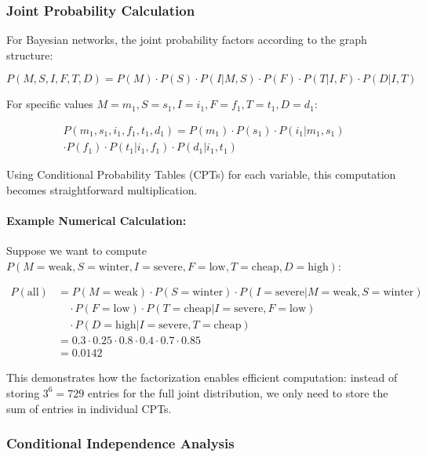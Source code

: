 \documentclass[conference]{IEEEtran}
\begin{document}
\subsubsection{Joint Probability Calculation}

For Bayesian networks, the joint probability factors according to the graph structure:

\begin{equation}
P(M, S, I, F, T, D) = P(M) \cdot P(S) \cdot P(I | M, S) \cdot P(F) \cdot P(T | I, F) \cdot P(D | I, T)
\end{equation}

For specific values $M = m_1, S = s_1, I = i_1, F = f_1, T = t_1, D = d_1$:

\begin{multline}
P(m_1, s_1, i_1, f_1, t_1, d_1) = P(m_1) \cdot P(s_1) \cdot P(i_1 | m_1, s_1) \\ 
\cdot P(f_1) \cdot P(t_1 | i_1, f_1) \cdot P(d_1 | i_1, t_1)
\end{multline}

Using Conditional Probability Tables (CPTs) for each variable, this computation becomes straightforward multiplication.

\paragraph{Example Numerical Calculation:}
Suppose we want to compute $P(M=\text{weak}, S=\text{winter}, I=\text{severe}, F=\text{low}, T=\text{cheap}, D=\text{high})$:

\begin{align*}
P(\text{all}) &= P(M=\text{weak}) \cdot P(S=\text{winter}) \cdot P(I=\text{severe} | M=\text{weak}, S=\text{winter}) \\
&\quad \cdot P(F=\text{low}) \cdot P(T=\text{cheap} | I=\text{severe}, F=\text{low}) \\
&\quad \cdot P(D=\text{high} | I=\text{severe}, T=\text{cheap}) \\
&= 0.3 \cdot 0.25 \cdot 0.8 \cdot 0.4 \cdot 0.7 \cdot 0.85 \\
&= 0.0142
\end{align*}

This demonstrates how the factorization enables efficient computation: instead of storing $3^6 = 729$ entries for the full joint distribution, we only need to store the sum of entries in individual CPTs.

\subsubsection{Conditional Independence Analysis}
\end{document}
